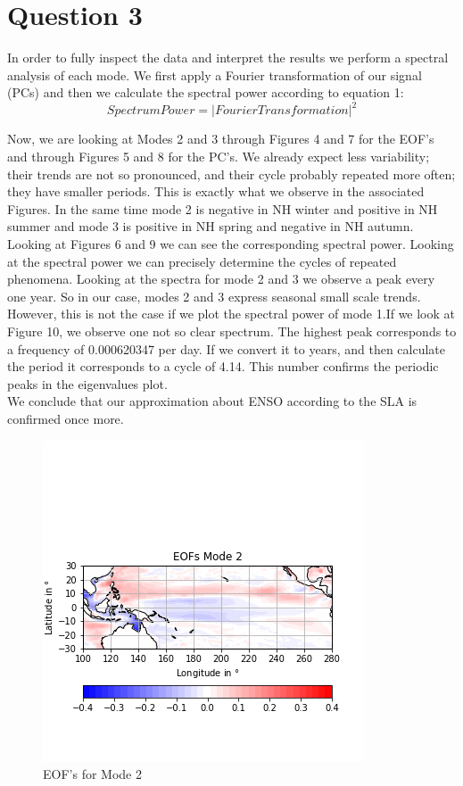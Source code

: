 \documentclass{article}
\begin{document}
\section*{Question 3}
In order to fully inspect the data and interpret the results we perform a spectral analysis of each mode. We first apply a Fourier transformation of our signal (PCs) and then we calculate the spectral power according to equation 1:
\begin{equation}
    SpectrumPower = |FourierTransformation|^2
\end{equation}

Now, we are looking at Modes 2 and 3 through Figures 4 and 7 for the EOF's and through Figures 5 and 8 for the PC's. We already expect less variability; their trends are not so pronounced, and their cycle probably repeated more often; they have smaller periods. This is exactly what we observe in the associated Figures. In the same time mode 2 is negative in NH winter and positive in NH summer and mode 3 is positive in NH spring and negative in NH autumn.
\\Looking at Figures 6 and 9 we can see the corresponding spectral power. Looking at the spectral power we can precisely determine the cycles of repeated phenomena. Looking at the spectra for mode 2 and 3 we observe a peak every one year. So in our case, modes 2 and 3 express seasonal small scale trends. However, this is not the case if we plot the spectral power of mode 1.If we look at Figure 10, we observe one not so clear spectrum. The highest peak corresponds to a frequency of 0.000620347 per day. If we convert it to years, and then calculate the period it corresponds to a cycle of 4.14. This number confirms the periodic peaks in the eigenvalues plot. 
\\We conclude that our approximation about ENSO according to the SLA is confirmed once more. 
\begin{figure}[b!]
\centering
\includegraphics[width=1.0\linewidth]{EOFmode2.png}
\caption{EOF's for Mode 2}
\label{fig:EOF2}
\end{figure}
\end{document}
